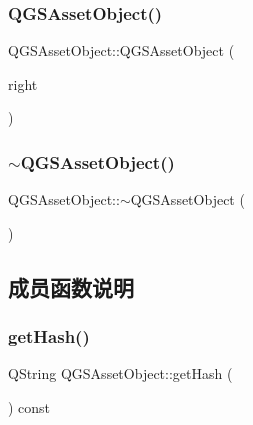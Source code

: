 \subsubsection{\texorpdfstring{Q\+G\+S\+Asset\+Object()}{QGSAssetObject()}\hspace{0.1cm}{\footnotesize\ttfamily [3/3]}}
{\footnotesize\ttfamily Q\+G\+S\+Asset\+Object\+::\+Q\+G\+S\+Asset\+Object (\begin{DoxyParamCaption}\item[{\mbox{\hyperlink{class_q_g_s_asset_object}{Q\+G\+S\+Asset\+Object}} \&\&}]{right }\end{DoxyParamCaption})\hspace{0.3cm}{\ttfamily [default]}}

\mbox{\label{class_q_g_s_asset_object_abf4ce82c5f881d501b7f91fb0754bcbf}} 
\subsubsection{\texorpdfstring{$\sim$\+Q\+G\+S\+Asset\+Object()}{~QGSAssetObject()}}
{\footnotesize\ttfamily Q\+G\+S\+Asset\+Object\+::$\sim$\+Q\+G\+S\+Asset\+Object (\begin{DoxyParamCaption}{ }\end{DoxyParamCaption})}



\subsection{成员函数说明}
\mbox{\label{class_q_g_s_asset_object_adc28463d615c23fcfc8e89e454675472}} 
\subsubsection{\texorpdfstring{get\+Hash()}{getHash()}}
{\footnotesize\ttfamily Q\+String Q\+G\+S\+Asset\+Object\+::get\+Hash (\begin{DoxyParamCaption}{ }\end{DoxyParamCaption}) const}

